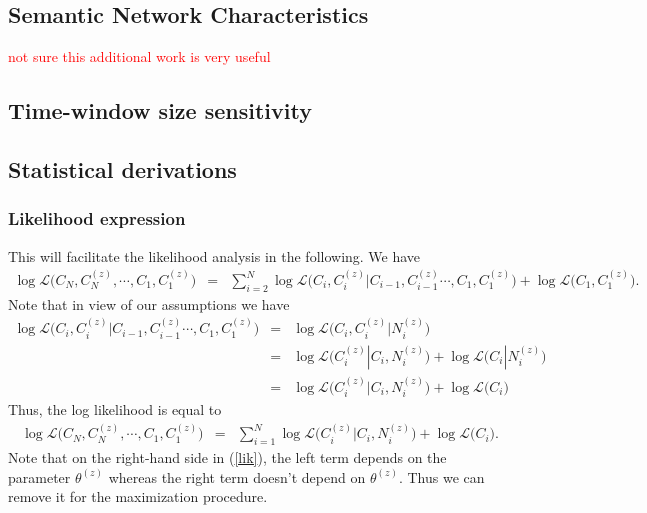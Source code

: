 \documentclass[10pt,A4]{article}
\begin{document}
\subsection*{Semantic Network Characteristics}


\textcolor{red}{not sure this additional work is very useful}




\subsection*{Time-window size sensitivity}












\subsection*{Statistical derivations}
\subsubsection*{Likelihood expression}
This will facilitate the likelihood analysis in the following. We have
\begin{eqnarray*}
\log \mathcal{L} \big( C_N, C_N^{(z)} , \cdots , C_1, C_1^{(z)} \big) & = & \sum_{i=2}^N \log \mathcal{L} \big( C_i, C_i^{(z)} | C_{i-1}, C_{i-1}^{(z)} \cdots , C_1, C_1^{(z)} \big) + \log \mathcal{L} \big( C_1, C_1^{(z)} \big).
\end{eqnarray*}
Note that in view of our assumptions we have
\begin{eqnarray*}
\log \mathcal{L} \big( C_i, C_i^{(z)} | C_{i-1}, C_{i-1}^{(z)} \cdots , C_1, C_1^{(z)} \big) & = & \log \mathcal{L} \big( C_i, C_i^{(z)} | N_{i}^{(z)} \big)\\
& = & \log \mathcal{L} \big(C_i^{(z)} | C_i , N_{i}^{(z)} \big) +
\log \mathcal{L} \big( C_i | N_{i}^{(z)} \big)\\
& = & \log \mathcal{L} \big(C_i^{(z)} | C_i , N_{i}^{(z)} \big) +
\log \mathcal{L} \big( C_i \big)
\end{eqnarray*}
Thus, the log likelihood is equal to
\begin{eqnarray}
\label{lik} \log \mathcal{L} \big( C_N, C_N^{(z)} , \cdots , C_1, C_1^{(z)} \big) & = &\sum_{i=1}^N  \log \mathcal{L} \big(C_i^{(z)} | C_i , N_{i}^{(z)} \big) +
\log \mathcal{L} \big( C_i \big).
\end{eqnarray}
Note that on the right-hand side in (\ref{lik}), the left term depends on the parameter $\theta^{(z)}$ whereas the right term doesn't depend on $\theta^{(z)}$. Thus we can remove it for the maximization procedure.
\end{document}
